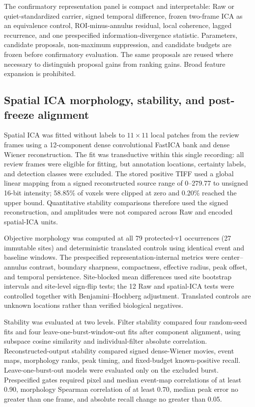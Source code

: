 The confirmatory representation panel is compact and interpretable: Raw or quiet-standardized carrier, signed temporal difference, frozen two-frame ICA as an equivalence control, ROI-minus-annulus residual, local coherence, lagged recurrence, and one prespecified information-divergence statistic. Parameters, candidate proposals, non-maximum suppression, and candidate budgets are frozen before confirmatory evaluation. The same proposals are reused where necessary to distinguish proposal gains from ranking gains. Broad feature expansion is prohibited.

\subsection{Spatial ICA morphology, stability, and post-freeze alignment}
\label{sec:spatial-ica-methods}

Spatial ICA was fitted without labels to $11\times11$ local patches from the review frames using a 12-component dense convolutional FastICA bank and dense Wiener reconstruction. The fit was transductive within this single recording: all review frames were eligible for fitting, but annotation locations, certainty labels, and detection classes were excluded. The stored positive TIFF used a global linear mapping from a signed reconstructed source range of 0--279.77 to unsigned 16-bit intensity; 58.85\% of voxels were clipped at zero and 0.20\% reached the upper bound. Quantitative stability comparisons therefore used the signed reconstruction, and amplitudes were not compared across Raw and encoded spatial-ICA units.

Objective morphology was computed at all 79 protected-v1 occurrences (27 immutable sites) and deterministic translated controls using identical event and baseline windows. The prespecified representation-internal metrics were center--annulus contrast, boundary sharpness, compactness, effective radius, peak offset, and temporal persistence. Site-blocked mean differences used site bootstrap intervals and site-level sign-flip tests; the 12 Raw and spatial-ICA tests were controlled together with Benjamini--Hochberg adjustment. Translated controls are unknown locations rather than verified biological negatives.

Stability was evaluated at two levels. Filter stability compared four random-seed fits and four leave-one-burst-window-out fits after component alignment, using subspace cosine similarity and individual-filter absolute correlation. Reconstructed-output stability compared signed dense-Wiener movies, event maps, morphology ranks, peak timing, and fixed-budget known-positive recall. Leave-one-burst-out models were evaluated only on the excluded burst. Prespecified gates required pixel and median event-map correlations of at least 0.90, morphology Spearman correlation of at least 0.70, median peak error no greater than one frame, and absolute recall change no greater than 0.05.

